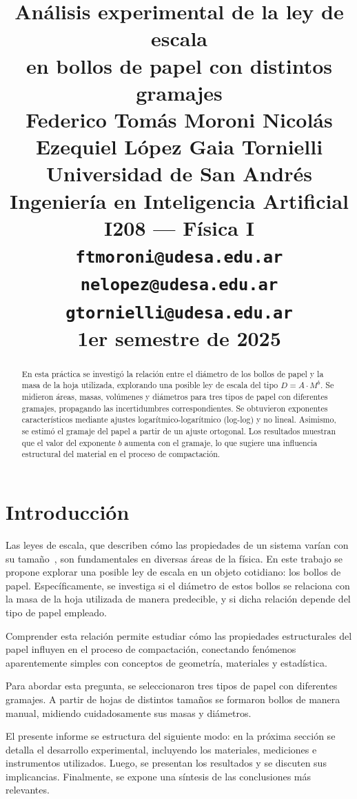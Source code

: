 \documentclass[12pt,a4]{article}
\title{
    \vspace*{1cm}
    \textbf{\LARGE Análisis experimental de la ley de escala\\[2pt]
    en bollos de papel con distintos gramajes}\\[1.2cm]
    \large Federico Tomás Moroni \quad Nicolás Ezequiel López \quad Gaia Tornielli\\[0.4cm]
    \normalsize Universidad de San Andrés\\
    Ingeniería en Inteligencia Artificial\\
    I208 — Física I\\[0.2cm]
    \texttt{ftmoroni@udesa.edu.ar} \quad \texttt{nelopez@udesa.edu.ar} \quad \texttt{gtornielli@udesa.edu.ar}\\[1cm]
    \normalsize \textbf{1er semestre de 2025}
    \vspace*{0.5cm}
}
\author{}
\date{}
\begin{document}
\maketitle
\begin{abstract}
En esta práctica se investigó la relación entre el diámetro de los bollos de papel y la masa de la hoja utilizada, explorando una posible ley de escala del tipo \( D = A \cdot M^b \). Se midieron áreas, masas, volúmenes y diámetros para tres tipos de papel con diferentes gramajes, propagando las incertidumbres correspondientes. Se obtuvieron exponentes característicos mediante ajustes logarítmico-logarítmico (log-log) y no lineal. Asimismo, se estimó el gramaje del papel a partir de un ajuste ortogonal. Los resultados muestran que el valor del exponente \( b \) aumenta con el gramaje, lo que sugiere una influencia estructural del material en el proceso de compactación.
\end{abstract}
\newpage
\renewcommand{\cfttoctitlefont}{\Large\bfseries}
\renewcommand{\contentsname}{Contenido}
\setlength{\cftbeforesecskip}{4pt}
\setlength{\cftbeforesubsecskip}{2pt}
\tableofcontents
\newpage

\section{Introducción}

Las leyes de escala, que describen cómo las propiedades de un sistema varían con su tamaño~\cite{clauset}, son fundamentales en diversas áreas de la física. En este trabajo se propone explorar una posible ley de escala en un objeto cotidiano: los bollos de papel. Específicamente, se investiga si el diámetro de estos bollos se relaciona con la masa de la hoja utilizada de manera predecible, y si dicha relación depende del tipo de papel empleado.

Comprender esta relación permite estudiar cómo las propiedades estructurales del papel influyen en el proceso de compactación, conectando fenómenos aparentemente simples con conceptos de geometría, materiales y estadística.

Para abordar esta pregunta, se seleccionaron tres tipos de papel con diferentes gramajes. A partir de hojas de distintos tamaños se formaron bollos de manera manual, midiendo cuidadosamente sus masas y diámetros. 

El presente informe se estructura del siguiente modo: en la próxima sección se detalla el desarrollo experimental, incluyendo los materiales, mediciones e instrumentos utilizados. Luego, se presentan los resultados y se discuten sus implicancias. Finalmente, se expone una síntesis de las conclusiones más relevantes.
\end{document}
